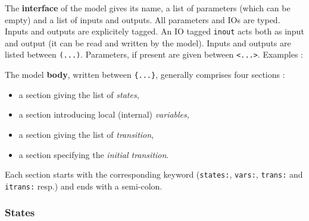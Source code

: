 \begin{center}
\end{center}

\medskip
The \textbf{interface} of the model gives its name, a list of parameters (which can be empty) and a
list of inputs and outputs. All parameters and IOs are typed. Inputs and outputs are explicitely
tagged. An IO tagged \verb|inout| acts both as input and output (it can be read and written by the
model). Inputs and outputs are listed between \verb|(...)|. Parameters, if present are given between
\verb|<...>|. Examples :

\begin{center}
\end{center}

\begin{center}
\end{center}

\begin{center}
\end{center}

\medskip
The model \textbf{body}, written between \verb|{...}|, generally comprises four sections :
\begin{itemize}
\item a section giving the list of \emph{states},
\item a section introducing local (internal) \emph{variables},
\item a section giving the list of \emph{transition},
\item a section specifying the \emph{initial transition}.
\end{itemize}

Each section starts with the corresponding keyword (\verb|states:|, \verb|vars:|, \verb|trans:| and
\verb|itrans:| resp.) and ends with a semi-colon.

\begin{center}
\end{center}

\subsubsection*{States}
\label{sec:states}

